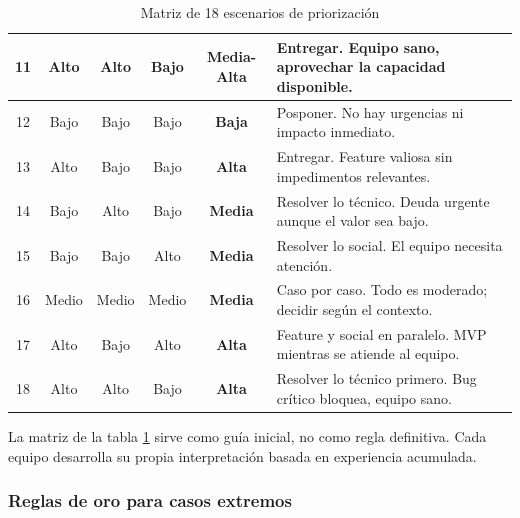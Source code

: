 \begin{table}[h]
\begin{tabularx}{\textwidth}{|c|c|c|c|c|X|}
        \hline
        11          & Alto           & Alto             & Bajo            & \textbf{Media-Alta} & Entregar. Equipo sano, aprovechar la capacidad disponible.                \\
        \hline
        12          & Bajo           & Bajo             & Bajo            & \textbf{Baja}       & Posponer. No hay urgencias ni impacto inmediato.                          \\
        \hline
        13          & Alto           & Bajo             & Bajo            & \textbf{Alta}       & Entregar. Feature valiosa sin impedimentos relevantes.                    \\
        \hline
        14          & Bajo           & Alto             & Bajo            & \textbf{Media}      & Resolver lo técnico. Deuda urgente aunque el valor sea bajo.              \\
        \hline
        15          & Bajo           & Bajo             & Alto            & \textbf{Media}      & Resolver lo social. El equipo necesita atención.                          \\
        \hline
        16          & Medio          & Medio            & Medio           & \textbf{Media}      & Caso por caso. Todo es moderado; decidir según el contexto.               \\
        \hline
        17          & Alto           & Bajo             & Alto            & \textbf{Alta}       & Feature y social en paralelo. MVP mientras se atiende al equipo.          \\
        \hline
        18          & Alto           & Alto             & Bajo            & \textbf{Alta}       & Resolver lo técnico primero. Bug crítico bloquea, equipo sano.            \\
        \hline
    \end{tabularx}
    \caption{Matriz de 18 escenarios de priorización}
    \label{tab:matriz-priorizacion}
\end{table}


\FloatBarrier

La matriz de la tabla \ref{tab:matriz-priorizacion} sirve como guía inicial, no como regla definitiva. Cada equipo desarrolla su propia interpretación basada en experiencia acumulada.

\subsubsection{Reglas de oro para casos extremos}

